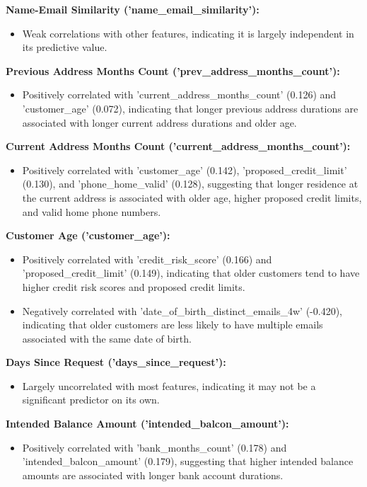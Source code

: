 \documentclass[12pt,a4paper]{report}
\begin{document}
\textbf{Name-Email Similarity ('name\_email\_similarity'):}
\begin{itemize}
    \item Weak correlations with other features, indicating it is largely independent in its predictive value.
\end{itemize}

\textbf{Previous Address Months Count ('prev\_address\_months\_count'):}
\begin{itemize}
    \item Positively correlated with 'current\_address\_months\_count' (0.126) and 'customer\_age' (0.072), indicating that longer previous address durations are associated with longer current address durations and older age.
\end{itemize}

\textbf{Current Address Months Count ('current\_address\_months\_count'):}
\begin{itemize}
    \item Positively correlated with 'customer\_age' (0.142), 'proposed\_credit\_limit' (0.130), and 'phone\_home\_valid' (0.128), suggesting that longer residence at the current address is associated with older age, higher proposed credit limits, and valid home phone numbers.
\end{itemize}

\textbf{Customer Age ('customer\_age'):}
\begin{itemize}
    \item Positively correlated with 'credit\_risk\_score' (0.166) and 'proposed\_credit\_limit' (0.149), indicating that older customers tend to have higher credit risk scores and proposed credit limits.
    \item Negatively correlated with 'date\_of\_birth\_distinct\_emails\_4w' (-0.420), indicating that older customers are less likely to have multiple emails associated with the same date of birth.
\end{itemize}

\textbf{Days Since Request ('days\_since\_request'):}
\begin{itemize}
    \item Largely uncorrelated with most features, indicating it may not be a significant predictor on its own.
\end{itemize}

\textbf{Intended Balance Amount ('intended\_balcon\_amount'):}
\begin{itemize}
    \item Positively correlated with 'bank\_months\_count' (0.178) and 'intended\_balcon\_amount' (0.179), suggesting that higher intended balance amounts are associated with longer bank account durations.
\end{itemize}
\end{document}
